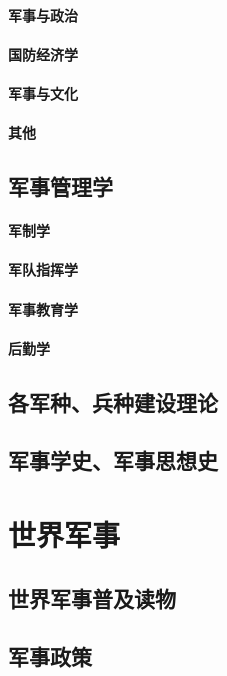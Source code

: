 \documentclass[UTF8]{../ApplicationUniverse}
\begin{document}
    \subsubsection{军事与政治}
    \subsubsection{国防经济学}
    \subsubsection{军事与文化}
    \subsubsection{其他}
\section{军事管理学}
    \subsubsection{军制学}
    \subsubsection{军队指挥学}
    \subsubsection{军事教育学}
    \subsubsection{后勤学}
\section{各军种、兵种建设理论}
\section{军事学史、军事思想史}






\chapter{世界军事}
\section{世界军事普及读物}
\section{军事政策}
\end{document}
